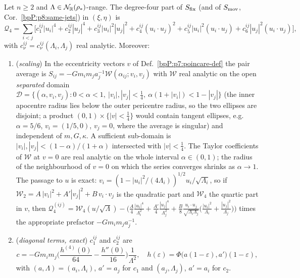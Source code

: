 \begin{proposition}\label{bpP:p8:quartic}
Let $n\ge2$ and $\Lambda\in\mathcal N_{\mathbb{R}}(\rho_*)$-range. The degree-four part of $S_{\rm fix}$ (and of $S_{\rm mov}$, Cor.~\ref{bpP:p8:same-jets}) in $(\xi,\eta)$ is
\[\mathcal Q_4=\sum_{i<j}\Big[c^{ij}_{1}|u_i|^4+c^{ij}_2|u_j|^4+c^{ij}_3|u_i|^2|u_j|^2+c^{ij}_4(u_i\cdot u_j)^2+c^{ij}_5|u_i|^2(u_i\cdot u_j)+c^{ij}_6|u_j|^2(u_i\cdot u_j)\Big],\]
with $c^{ij}_\nu=c^{ij}_\nu(\Lambda_i,\Lambda_j)$ real analytic. Moreover:
\begin{enumerate}[label=(\alph*)]
\item (\emph{scaling}) In the eccentricity vectors $v$ of Def.~\ref{bpP:p7:poincare-def} the pair average is $S_{ij}=-Gm_im_ja_j^{-1}\mathcal W(\alpha_{ij};v_i,v_j)$ with $\mathcal W$ real analytic on the open \emph{separated} domain $\mathcal D=\{(\alpha,v_i,v_j):0<\alpha<1,\ |v_i|,|v_j|<\tfrac14,\ \alpha(1+|v_i|)<1-|v_j|\}$ (the inner apocentre radius lies below the outer pericentre radius, so the two ellipses are disjoint; a product $(0,1)\times\{|v|<\frac14\}$ would contain tangent ellipses, e.g.\ $\alpha=5/6$, $v_i=(1/5,0)$, $v_j=0$, where the average is singular) and independent of $m,G,\kappa$. A sufficient sub-domain is $|v_i|,|v_j|<(1-\alpha)/(1+\alpha)$ intersected with $|v|<\tfrac14$. The Taylor coefficients of $\mathcal W$ at $v=0$ are real analytic on the whole interval $\alpha\in(0,1)$; the radius of the neighbourhood of $v=0$ on which the series converges shrinks as $\alpha\to1$. The passage to $u$ is exact: $v_i=(1-|u_i|^2/(4\Lambda_i))^{1/2}u_i/\sqrt{\Lambda_i}$, so if $\mathcal W_2=A\,|v_i|^2+A'|v_j|^2+B\,v_i\cdot v_j$ is the quadratic part and $\mathcal W_4$ the quartic part in $v$, then $\mathcal Q_4^{(ij)}=\mathcal W_4(u/\sqrt\Lambda)-\big(\tfrac{A}{4}\tfrac{|u_i|^4}{\Lambda_i^2}+\tfrac{A'}4\tfrac{|u_j|^4}{\Lambda_j^2}+\tfrac B8\tfrac{u_i\cdot u_j}{\sqrt{\Lambda_i\Lambda_j}}\big(\tfrac{|u_i|^2}{\Lambda_i}+\tfrac{|u_j|^2}{\Lambda_j}\big)\big)$ times the appropriate prefactor $-Gm_im_ja_j^{-1}$.
\item (\emph{diagonal terms, exact}) $c_1^{ij}$ and $c_2^{ij}$ are
\[c=-Gm_im_j\Big(\frac{h^{(4)}(0)}{64}-\frac{h''(0)}{16}\Big)\frac1{\Lambda^2},\quad h(\varepsilon)=\Phi\big(a(1-\varepsilon),a'\big)(1-\varepsilon),\]
with $(a,\Lambda)=(a_i,\Lambda_i)$, $a'=a_j$ for $c_1$ and $(a_j,\Lambda_j)$, $a'=a_i$ for $c_2$.

\end{enumerate}
\end{proposition}
